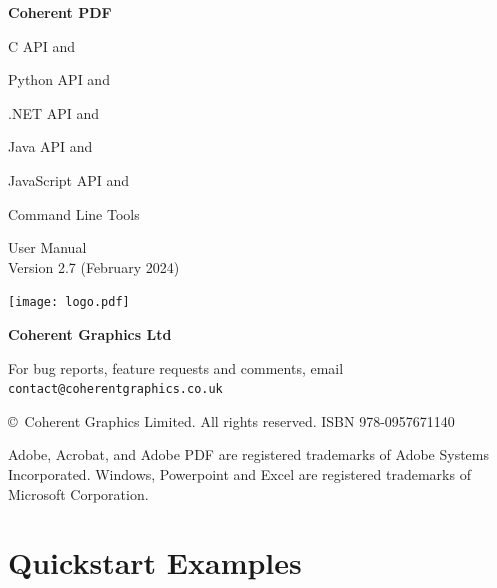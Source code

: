 \documentclass{book}
\newcommand{\smallgap}{\bigskip}
\begin{document}
\frontmatter
\pagestyle{empty}


\begin{flushright}


{\sffamily \bfseries \Huge Coherent PDF

\vspace{2mm}
\begin{cpdflib}
C API and 
\end{cpdflib}
\begin{pycpdflib}
Python API and
\end{pycpdflib}
\begin{dotnetcpdflib}
.NET API and
\end{dotnetcpdflib}
\begin{jcpdflib}
Java API and
\end{jcpdflib}
\begin{jscpdflib}
JavaScript API and
\end{jscpdflib}
Command Line Tools}

\vspace{12mm}

{\Huge User Manual}\\
Version 2.7 (February 2024)

\vspace{25mm}

\vfill
\ifdefined\HCode
\else
\texttt{[image: logo.pdf]}
\fi


\vspace{2mm}
{\sffamily \bfseries \LARGE Coherent Graphics Ltd}

\end{flushright}

\clearpage

\pagestyle{empty}
\noindent For bug reports, feature requests and comments, email\\ \texttt{contact@coherentgraphics.co.uk}

\vspace*{\fill}
\noindent\copyright\ Coherent Graphics Limited. All rights reserved. ISBN 978-0957671140

\smallgap 
\noindent Adobe, Acrobat, and Adobe PDF are
registered trademarks of Adobe Systems Incorporated. Windows, Powerpoint and
Excel are registered trademarks of Microsoft Corporation.

\cleardoublepage

\pagestyle{plain}
\chapter*{Quickstart Examples}
\end{document}

